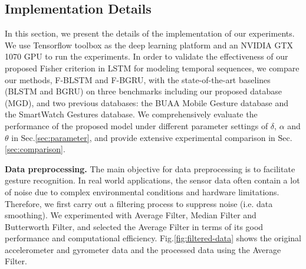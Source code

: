 \documentclass[review]{elsarticle}
\begin{document}
\subsection{Implementation Details}\label{sec:preprocess}In this section, we present the details of the implementation of our experiments. We use Tensorflow toolbox as the deep learning platform and an NVIDIA GTX 1070 GPU to run the experiments. In order to validate the effectiveness of our proposed Fisher criterion in LSTM for modeling temporal sequences, we compare our methods, F-BLSTM and F-BGRU, with the state-of-the-art baselines (BLSTM and BGRU\;\cite{chung2014eprint}) on three benchmarks including our proposed database (MGD), and two previous databases: the BUAA Mobile Gesture database\;\cite{xie2016ccbr} and the SmartWatch Gestures database\;\cite{chung2014eprint}. We comprehensively evaluate the performance of the proposed model under different parameter settings of $\delta$, $\alpha$ and $\theta$ in Sec.\;\ref{sec:parameter}, and provide extensive experimental comparison in Sec.\;\ref{sec:comparison}.

\textbf{Data preprocessing.} The main objective for data preprocessing is to facilitate gesture recognition. In real world applications, the sensor data often contain a lot of noise due to complex environmental conditions and hardware limitations. Therefore, we first carry out a filtering process to suppress noise (i.e. data smoothing). We experimented with Average Filter, Median Filter and Butterworth Filter, and selected the Average Filter in terms of its good performance and computational efficiency. Fig.\;\ref{fig:filtered-data} shows the original accelerometer and gyrometer data and the processed data using the Average Filter.

\begin{figure*}[htbp]
	\normalsize
	\centering
	\\
	\\
	\caption{The original accelerometer and gyrometer data vs. the processed data by Moving Average Filter.}
	\label{fig:filtered-data}
	\vspace*{4pt}
\end{figure*}
\end{document}
